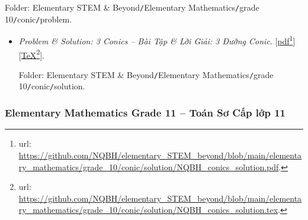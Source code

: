 \documentclass[12pt,oneside]{book}
\begin{document}
\begin{enumerate}
	Folder: {\sf Elementary STEM \& Beyond{\tt/}Elementary Mathematics{\tt/}grade 10{\tt/}conic{\tt/}problem}.
	\begin{itemize}
		\item {\it Problem \& Solution: 3 Conics -- Bài Tập \& Lời Giải: 3 Đường Conic}. [\href{https://github.com/NQBH/elementary_STEM_beyond/blob/main/elementary_mathematics/grade_10/conic/solution/NQBH_conics_solution.pdf}{pdf}\footnote{{\sc url}: \url{https://github.com/NQBH/elementary_STEM_beyond/blob/main/elementary_mathematics/grade_10/conic/solution/NQBH_conics_solution.pdf}.}][\href{https://github.com/NQBH/elementary_STEM_beyond/blob/main/elementary_mathematics/grade_10/conic/solution/NQBH_conics_solution.tex}{\TeX}\footnote{{\sc url}: \url{https://github.com/NQBH/elementary_STEM_beyond/blob/main/elementary_mathematics/grade_10/conic/solution/NQBH_conics_solution.tex}.}].
		
		Folder: {\sf Elementary STEM \& Beyond{\tt/}Elementary Mathematics{\tt/}grade 10{\tt/}conic{\tt/}solution}.
	\end{itemize}
\end{enumerate}

\subsubsection{Elementary Mathematics Grade 11 -- Toán Sơ Cấp lớp 11}
\end{document}

